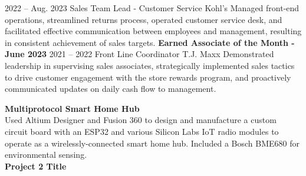 \documentclass[9pt]{developercv} %
\begin{document}

\begin{entrylist}
	\entry
		{2022 -- Aug. 2023}
		{Sales Team Lead - Customer Service}
		{Kohl's}
		{Managed front-end operations, streamlined returns process, operated customer service desk, and facilitated effective communication between employees and management, resulting in consistent achievement of sales targets.  \textbf{Earned Associate of the Month - June 2023} }
		\entry
		{2021 -- 2022}
		{Front Line Coordinator}
		{T.J. Maxx}
		{Demonstrated leadership in supervising sales associates, strategically implemented sales tactics to drive customer engagement with the store rewards program, and proactively communicated updates on daily cash flow to management.}
\end{entrylist}



\begin{minipage}[t]{1\textwidth} %
	\vspace{-\baselineskip} %
	\textbf{Multiprotocol Smart Home Hub}\\
	Used Altium Designer and Fusion 360 to design and manufacture a custom circuit board with an ESP32 and various Silicon Labs IoT radio modules to operate as a wirelessly-connected smart home hub. Included a Bosch BME680 for environmental sensing.\\
	\linebreak
	\textbf{Project 2 Title}\\
	\lorem \lorem \lorem\\
\end{minipage}

\vspace{0.5cm}

\end{document}
